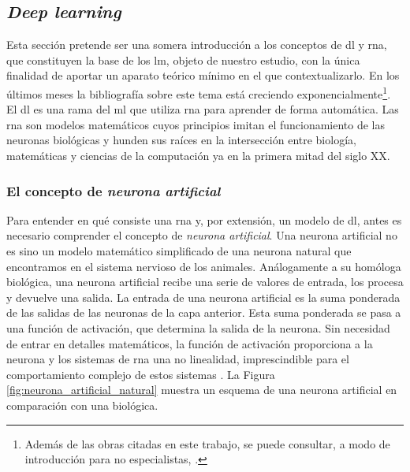 \subsection{\emph{Deep learning}}

Esta sección pretende ser una somera introducción a los conceptos de \gls{dl} y \gls{rna}, que constituyen la base de los \gls{lm}, objeto de nuestro estudio, con la única finalidad de aportar un aparato teórico mínimo en el que contextualizarlo. En los últimos meses la bibliografía sobre este tema está creciendo exponencialmente\footnote{Además de las obras citadas en este trabajo, se puede consultar, a modo de introducción para no especialistas, \cite{BeginnerGuideNeural}.}. El \gls{dl} es una rama del \gls{ml} que utiliza \gls{rna} para aprender de forma automática. Las \gls{rna} son modelos matemáticos cuyos principios imitan el funcionamiento de las neuronas biológicas y hunden sus raíces en la intersección entre biología, matemáticas y ciencias de la computación ya en la primera mitad del siglo XX.

\subsubsection{El concepto de \emph{neurona artificial}}

Para entender en qué consiste una \gls{rna} y, por extensión, un modelo de \gls{dl}, antes es necesario comprender el concepto de \emph{neurona artificial}. Una neurona artificial no es sino un modelo matemático simplificado de una neurona natural que encontramos en el sistema nervioso de los animales. Análogamente a su homóloga biológica, una neurona artificial recibe una serie de valores de entrada, los procesa y devuelve una salida. La entrada de una neurona artificial es la suma ponderada de las salidas de las neuronas de la capa anterior. Esta suma ponderada se pasa a una función de activación, que determina la salida de la neurona. Sin necesidad de entrar en detalles matemáticos, la función de activación proporciona a la neurona y los sistemas de \gls{rna} una no linealidad, imprescindible para el comportamiento complejo de estos sistemas \citep{torresivinalsPythonDeepLearning2020,zhang2023dive}. La Figura \ref{fig:neurona_artificial_natural} muestra un esquema de una neurona artificial en comparación con una biológica.

